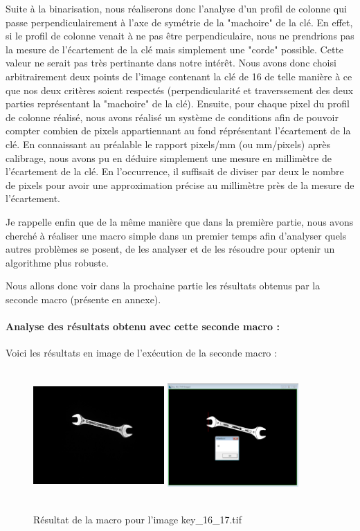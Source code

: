 \documentclass{scrreprt}
\begin{document}
Suite à la binarisation, nous réaliserons donc l'analyse d'un profil de colonne qui passe perpendiculairement à l'axe de symétrie 
de la "machoire" de la clé. En effet, si le profil de colonne venait à ne pas être perpendiculaire, nous ne prendrions pas la mesure 
de l'écartement de la clé mais simplement une "corde" possible. Cette valeur ne serait pas très pertinante dans notre intérêt. 
Nous avons donc choisi arbitrairement deux points de l'image contenant la clé de 16 de telle manière à ce que nos deux critères soient respectés
(perpendicularité et traverssement des deux parties représentant la "machoire" de la clé). Ensuite, pour chaque pixel du profil de colonne réalisé, 
nous avons réalisé un système de conditions afin de pouvoir compter combien de pixels appartiennant au fond réprésentant l'écartement de la clé. 
En connaissant au préalable le rapport pixels/mm (ou mm/pixels) après calibrage, nous avons pu en déduire simplement une mesure en millimètre de
l'écartement de la clé. En l'occurrence, il suffisait de diviser par deux le nombre de pixels pour avoir une approximation précise au millimètre près 
de la mesure de l'écartement.    

Je rappelle enfin que de la même manière que dans la première partie, nous avons cherché à réaliser une macro simple dans un premier temps
afin d'analyser quels autres problèmes se posent, de les analyser et de les résoudre pour optenir un algorithme plus robuste. 

Nous allons donc voir dans la prochaine partie les résultats obtenus par la seconde macro (présente en annexe). 

\paragraph{Analyse des résultats obtenu avec cette seconde macro : }

Voici les résultats en image de l'exécution de la seconde macro : 

\begin{figure}[!h]
\centering
\includegraphics[width=5cm, height=5cm]{images/key1617.png}\hfill
\includegraphics[width=5cm, height=5cm]{images/key16.png}
\caption{Résultat de la macro pour l'image key_16_17.tif}
\end{figure}
\end{document}
